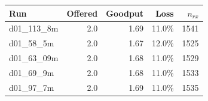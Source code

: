 \begin{tabular}{lrrrr}
\hline
Run & Offered & Goodput & Loss & $n_{rx}$ \\
\hline
d01\_113\_8m & 2.0 & 1.69 & 11.0\% & 1541 \\
d01\_58\_5m & 2.0 & 1.67 & 12.0\% & 1525 \\
d01\_63\_09m & 2.0 & 1.68 & 11.0\% & 1529 \\
d01\_69\_9m & 2.0 & 1.68 & 11.0\% & 1533 \\
d01\_97\_7m & 2.0 & 1.69 & 11.0\% & 1535 \\
\hline
\end{tabular}
